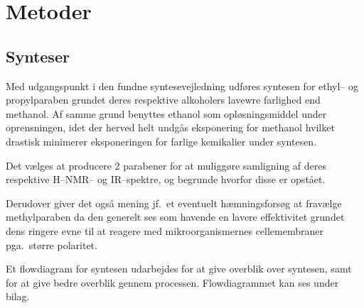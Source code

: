 \section{Metoder}
    \subsection{Synteser} 
    Med udgangspunkt i den fundne syntesevejledning \parencite{Ole2019} udføres syntesen for ethyl-- og propylparaben grundet deres respektive alkoholers lavewre farlighed end methanol. Af samme grund benyttes ethanol som opløsningsmiddel under oprensningen, idet der herved helt undgås eksponering for methanol hvilket drastisk minimerer eksponeringen for farlige kemikalier under syntesen.

    Det vælges at producere 2 parabener for at muliggøre samligning af deres respektive H--NMR-- og IR--spektre, og begrunde hvorfor disse er opstået. 

    Derudover giver det også mening jf.\ et eventuelt hæmningsforsøg at fravælge methylparaben da den generelt ses som havende en lavere effektivitet grundet dens ringere evne til at reagere med mikroorganismernes cellemembraner pga.\ større polaritet.

    Et flowdiagram for syntesen udarbejdes for at give overblik over syntesen, samt for at give bedre overblik gennem processen. Flowdiagrammet kan ses under bilag.

